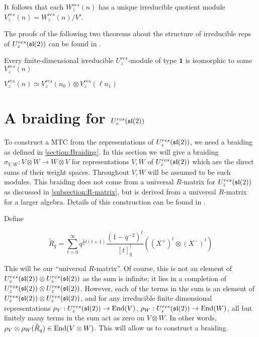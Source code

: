 It follows that each $W_z^{res}(n)$ has a unique irreducible quotient module $V_z^{res}(n) = W_z^{res}(n) / V'$. 

The proofs of the following two theorems about the structure of irreducible reps of $U_z^{res}(\mathfrak{sl}(2))$ can be found in \cite{CP}.
\begin{theorem}
Every finite-dimensional irreducible $U_z^{res}$-module of type $\mathbf{1}$ is isomorphic to some $V_z^{res}(n)$
\end{theorem}

\begin{theorem}
$V_z^{res}(n) \simeq V_z^{res}(n_0) \otimes V_{z}^{res}(\ell n_1)$
\end{theorem}

\section{A braiding for $U_z^{res}(\mathfrak{sl}(2))$}
\label{section:braiding}

To construct a MTC from the representations of $U_z^{res}(\mathfrak{sl}(2))$, we need a
braiding as defined in \ref{section:Braiding}.  In this section we will give a
braiding $\sigma_{V,W}: V \otimes W \to W \otimes V$ for representations $V,W$
of $U_z^{res}(\mathfrak{sl}(2))$ which are the direct sums of their weight spaces.
Throughout $V,W$ will be assumed to be such modules. This braiding does not
come from a universal $R$-matrix for $U_z^{res}(\mathfrak{sl}(2))$ as discussed in
\ref{subsection:R-matrix}, but is derived from a universal $R$-matrix for a
larger algebra. Details of this construction can be found in \cite{CP}.


Define 

\begin{equation}
\tilde{R}_q = \sum_{t=0}^\infty q^{\frac{1}{2} t(t+1)} \frac{(1-q^{-2})^t}{[t]_q^{!}} ((X^+)^t \otimes (X^-)^t)
\end{equation}

This will be our ``universal $R$-matrix''. Of course, this is not an element of
$U_z^{res}(\mathfrak{sl}(2)) \otimes U_z^{res}(\mathfrak{sl}(2))$ as the sum is infinite; it lies in a
completion of $U_z^{res}(\mathfrak{sl}(2)) \otimes U_z^{res}(\mathfrak{sl}(2))$. However, each of the terms
in the sum is an element of $U_z^{res}(\mathfrak{sl}(2)) \otimes U_z^{res}(\mathfrak{sl}(2))$, and for any
irreducible finite dimensional representations $\rho_V : U_z^{res}(\mathfrak{sl}(2)) \to
\operatorname{End}(V)$, $\rho_W : U_z^{res}(\mathfrak{sl}(2)) \to \operatorname{End}(W)$, all but finitely many terms in the
sum act as zero on $V \otimes W$. In other words, $\rho_V \otimes \rho_W
(\tilde{R}_q) \in \operatorname{End}(V \otimes W)$. This will allow us to construct a
braiding.


